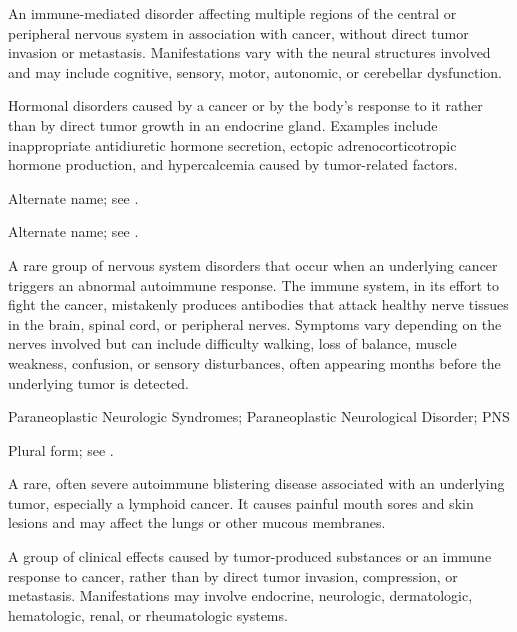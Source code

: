  An immune-mediated disorder affecting multiple regions of the central or peripheral nervous system in association with cancer, without direct tumor invasion or metastasis. Manifestations vary with the neural structures involved and may include cognitive, sensory, motor, autonomic, or cerebellar dysfunction.

 Hormonal disorders caused by a cancer or by the body's response to it rather than by direct tumor growth in an endocrine gland. Examples include inappropriate antidiuretic hormone secretion, ectopic adrenocorticotropic hormone production, and hypercalcemia caused by tumor-related factors.

 Alternate name; see .

 Alternate name; see .

 A rare group of nervous system disorders that occur when an underlying cancer triggers an abnormal autoimmune response. The immune system, in its effort to fight the cancer, mistakenly produces antibodies that attack healthy nerve tissues in the brain, spinal cord, or peripheral nerves. Symptoms vary depending on the nerves involved but can include difficulty walking, loss of balance, muscle weakness, confusion, or sensory disturbances, often appearing months before the underlying tumor is detected.

\synonyms
Paraneoplastic Neurologic Syndromes; Paraneoplastic Neurological Disorder; PNS

 Plural form; see .

 A rare, often severe autoimmune blistering disease associated with an underlying tumor, especially a lymphoid cancer. It causes painful mouth sores and skin lesions and may affect the lungs or other mucous membranes.

 A group of clinical effects caused by tumor-produced substances or an immune response to cancer, rather than by direct tumor invasion, compression, or metastasis. Manifestations may involve endocrine, neurologic, dermatologic, hematologic, renal, or rheumatologic systems.

